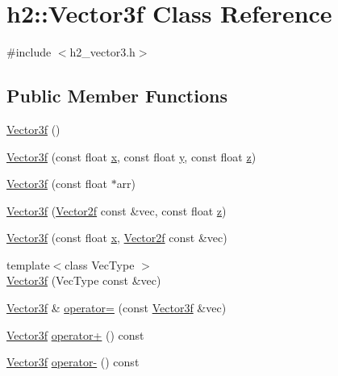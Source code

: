 \hypertarget{classh2_1_1_vector3f}{\section{h2\-:\-:Vector3f Class Reference}
\label{classh2_1_1_vector3f}
}


{\ttfamily \#include $<$h2\-\_\-vector3.\-h$>$}

\subsection*{Public Member Functions}
\begin{DoxyCompactItemize}
\item 
\hyperlink{classh2_1_1_vector3f_a343594d09e4cf0e52652842a8fe95664}{Vector3f} ()
\item 
\hyperlink{classh2_1_1_vector3f_aeebcaaf1f90c20e31cec1008e787986f}{Vector3f} (const float \hyperlink{classh2_1_1_vector3f_ab3cc458a2c088d8ecc160a1aaf3fc81d}{x}, const float \hyperlink{classh2_1_1_vector3f_ad8d143b9b36116553c41c76a4de569ff}{y}, const float \hyperlink{classh2_1_1_vector3f_acea4aa4f8702625f04fb73cf4b4d7be5}{z})
\item 
\hyperlink{classh2_1_1_vector3f_a4b2206591f41e03fc8e4944cf022a8bc}{Vector3f} (const float $\ast$arr)
\item 
\hyperlink{classh2_1_1_vector3f_acde96c1a2eac6b202b77cae786ebee7f}{Vector3f} (\hyperlink{classh2_1_1_vector2f}{Vector2f} const \&vec, const float \hyperlink{classh2_1_1_vector3f_acea4aa4f8702625f04fb73cf4b4d7be5}{z})
\item 
\hyperlink{classh2_1_1_vector3f_a8b92fb470b65b6d9f3128fba0ccdefc7}{Vector3f} (const float \hyperlink{classh2_1_1_vector3f_ab3cc458a2c088d8ecc160a1aaf3fc81d}{x}, \hyperlink{classh2_1_1_vector2f}{Vector2f} const \&vec)
\item 
{\footnotesize template$<$class Vec\-Type $>$ }\\\hyperlink{classh2_1_1_vector3f_a8115c97cdde9b86155411b169da5bb83}{Vector3f} (Vec\-Type const \&vec)
\item 
\hyperlink{classh2_1_1_vector3f}{Vector3f} \& \hyperlink{classh2_1_1_vector3f_a53fe23ad729f7610667e023d3731840c}{operator=} (const \hyperlink{classh2_1_1_vector3f}{Vector3f} \&vec)
\item 
\hyperlink{classh2_1_1_vector3f}{Vector3f} \hyperlink{classh2_1_1_vector3f_a6ed977a775315318abcd33a93db9c9fd}{operator+} () const 
\item 
\hyperlink{classh2_1_1_vector3f}{Vector3f} \hyperlink{classh2_1_1_vector3f_ae5576e3c06f484686ee88b141b1e9906}{operator-\/} () const 

\end{DoxyCompactItemize}

